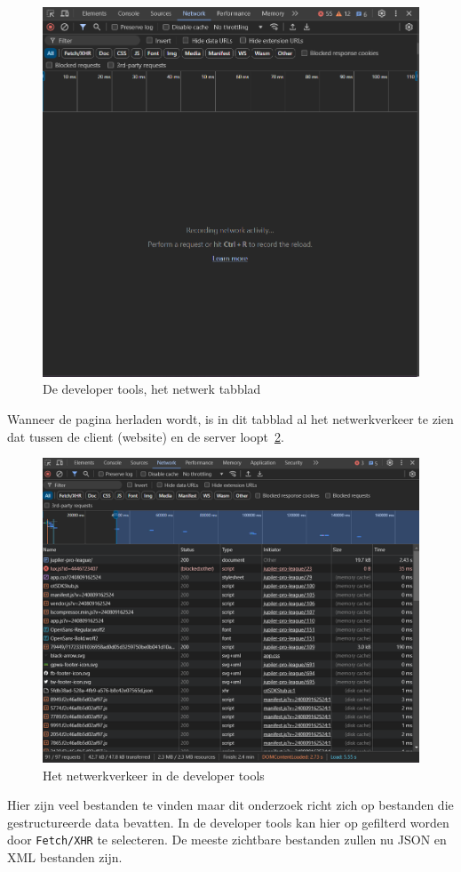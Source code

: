 \begin{figure}[h]
    \centering
    \includegraphics[width=\linewidth]{graphics/DevTools1.png}
    \caption{De developer tools, het netwerk tabblad}
    \label{fig:networktab}
\end{figure}

Wanneer de pagina herladen wordt, is in dit tabblad al het netwerkverkeer te zien dat tussen de client (website) en de server loopt~\ref{fig:networktab2}.

\begin{figure}[ht]
    \centering
    \includegraphics[width=\linewidth]{graphics/DevTools2.png}
    \caption{Het netwerkverkeer in de developer tools}
    \label{fig:networktab2}
\end{figure}

Hier zijn veel bestanden te vinden maar dit onderzoek richt zich op bestanden die gestructureerde data bevatten. In de developer tools kan hier op gefilterd worden door \texttt{Fetch/XHR} te selecteren. De meeste zichtbare bestanden zullen nu JSON en XML bestanden zijn.
